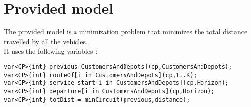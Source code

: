 \documentclass{eplDoc}
\begin{document}
\maketitle
\newpage
\section{Provided model}
The provided model is a minimization problem that minimizes the total distance travelled by all the vehicles.  \\ 
It uses the following variables :
\begin{lstlisting}
var<CP>{int} previous[CustomersAndDepots](cp,CustomersAndDepots);
var<CP>{int} routeOf[i in CustomersAndDepots](cp,1..K);
var<CP>{int} service_start[i in CustomersAndDepots](cp,Horizon);
var<CP>{int} departure[i in CustomersAndDepots](cp,Horizon);
var<CP>{int} totDist = minCircuit(previous,distance);
\end{lstlisting}
\end{document}
